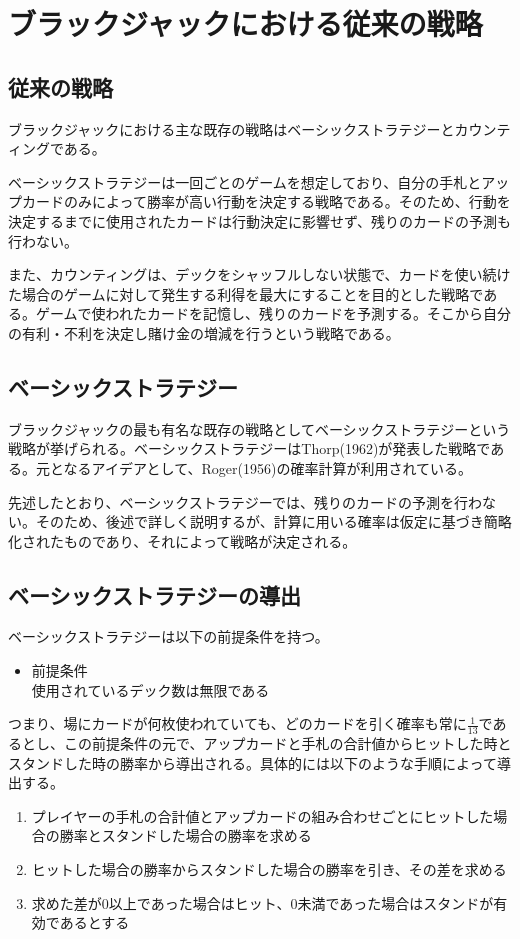     \section{ブラックジャックにおける従来の戦略}
    \subsection{従来の戦略}

        ブラックジャックにおける主な既存の戦略はベーシックストラテジーとカウンティングである。

        ベーシックストラテジーは一回ごとのゲームを想定しており、自分の手札とアップカードのみによって勝率が高い行動を決定する戦略である。そのため、行動を決定するまでに使用されたカードは行動決定に影響せず、残りのカードの予測も行わない。

        また、カウンティングは、デックをシャッフルしない状態で、カードを使い続けた場合のゲームに対して発生する利得を最大にすることを目的とした戦略である。ゲームで使われたカードを記憶し、残りのカードを予測する。そこから自分の有利・不利を決定し賭け金の増減を行うという戦略である。
    \subsection{ベーシックストラテジー}
        ブラックジャックの最も有名な既存の戦略としてベーシックストラテジーという戦略が挙げられる。ベーシックストラテジーはThorp(1962)が発表した戦略である。元となるアイデアとして、Roger(1956)の確率計算が利用されている。

        先述したとおり、ベーシックストラテジーでは、残りのカードの予測を行わない。そのため、後述で詳しく説明するが、計算に用いる確率は仮定に基づき簡略化されたものであり、それによって戦略が決定される。
    \subsection{ベーシックストラテジーの導出}
        ベーシックストラテジーは以下の前提条件を持つ。
        \begin{itemize}
            \item 前提条件\\
                使用されているデック数は無限である
        \end{itemize}

        つまり、場にカードが何枚使われていても、どのカードを引く確率も常に$\frac{1}{13}$であるとし、この前提条件の元で、アップカードと手札の合計値からヒットした時とスタンドした時の勝率から導出される。具体的には以下のような手順によって導出する。
        \begin{enumerate}
            \item プレイヤーの手札の合計値とアップカードの組み合わせごとにヒットした場合の勝率とスタンドした場合の勝率を求める
            \item ヒットした場合の勝率からスタンドした場合の勝率を引き、その差を求める
            \item 求めた差が0以上であった場合はヒット、0未満であった場合はスタンドが有効であるとする
        \end{enumerate}

